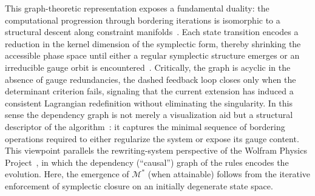 \documentclass[11pt,a4paper]{article}
\begin{document}
	
	
	This graph-theoretic representation exposes a fundamental duality: the computational progression through bordering iterations is isomorphic to a structural descent along constraint manifolds~\cite{Gotay1978,ArnoldBook,Marsden1999}. Each state transition encodes a reduction in the kernel dimension of the symplectic form, thereby shrinking the accessible phase space until either a regular symplectic structure emerges or an irreducible gauge orbit is encountered~\cite{Henneaux1992,MarsdenWeinstein1974}. Critically, the graph is acyclic in the absence of gauge redundancies, the dashed feedback loop closes only when the determinant criterion fails, signaling that the current extension has induced a consistent Lagrangian redefinition without eliminating the singularity. In this sense the dependency graph is not merely a visualization aid but a structural descriptor of the algorithm~\cite{Gorard2024,Wolfram2002}: it captures the minimal sequence of bordering operations required to either regularize the system or expose its gauge content. This viewpoint parallels the rewriting-system perspective of the Wolfram Physics Project~\cite{WolframPhysics2020}, in which the dependency (``causal'') graph of the rules encodes the evolution. Here, the emergence of $\mathcal{M}^*$ (when attainable) follows from the iterative enforcement of symplectic closure on an initially degenerate state space.
	
	
	
\end{document}
